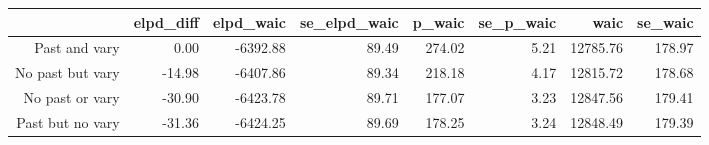 \begin{table}[ht]
\centering
\begin{tabular}{rrrrrrrr}
  \hline
 & elpd\_diff & elpd\_waic & se\_elpd\_waic & p\_waic & se\_p\_waic & waic & se\_waic \\ 
  \hline
Past and vary & 0.00 & -6392.88 & 89.49 & 274.02 & 5.21 & 12785.76 & 178.97 \\ 
  No past but vary & -14.98 & -6407.86 & 89.34 & 218.18 & 4.17 & 12815.72 & 178.68 \\ 
  No past or vary & -30.90 & -6423.78 & 89.71 & 177.07 & 3.23 & 12847.56 & 179.41 \\ 
  Past but no vary & -31.36 & -6424.25 & 89.69 & 178.25 & 3.24 & 12848.49 & 179.39 \\ 
   \hline
\end{tabular}
\end{table}
